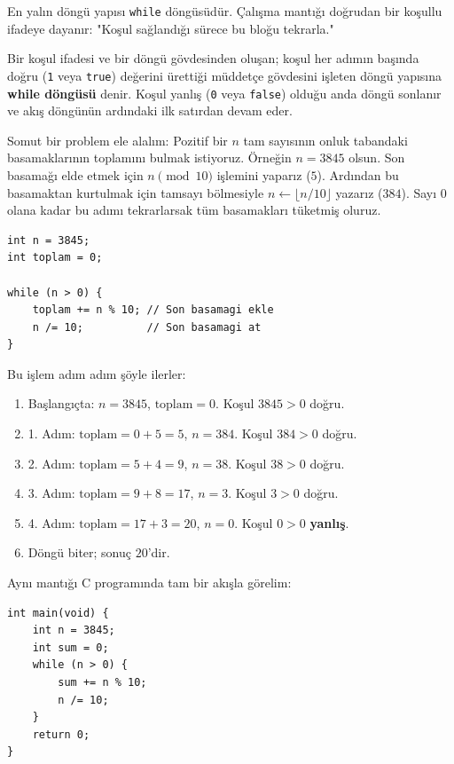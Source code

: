 En yalın döngü yapısı \texttt{while} döngüsüdür. Çalışma mantığı doğrudan bir koşullu ifadeye dayanır: "Koşul sağlandığı sürece bu bloğu tekrarla."

\begin{definition}
Bir koşul ifadesi ve bir döngü gövdesinden oluşan; koşul her adımın başında doğru (\texttt{1} veya \texttt{true}) değerini ürettiği müddetçe gövdesini işleten döngü yapısına \textbf{while döngüsü} denir. Koşul yanlış (\texttt{0} veya \texttt{false}) olduğu anda döngü sonlanır ve akış döngünün ardındaki ilk satırdan devam eder.
\end{definition}

Somut bir problem ele alalım: Pozitif bir $n$ tam sayısının onluk tabandaki basamaklarının toplamını bulmak istiyoruz. Örneğin $n = 3845$ olsun. Son basamağı elde etmek için $n \pmod{10}$ işlemini yaparız ($5$). Ardından bu basamaktan kurtulmak için tamsayı bölmesiyle $n \leftarrow \lfloor n / 10 \rfloor$ yazarız ($384$). Sayı $0$ olana kadar bu adımı tekrarlarsak tüm basamakları tüketmiş oluruz.

\begin{lstlisting}[language=CTemel]
int n = 3845;
int toplam = 0;

while (n > 0) {
    toplam += n % 10; // Son basamagi ekle
    n /= 10;          // Son basamagi at
}
\end{lstlisting}

Bu işlem adım adım şöyle ilerler:
\begin{enumerate}
    \item Başlangıçta: $n = 3845$, $\text{toplam} = 0$. Koşul $3845 > 0$ doğru.
    \item 1. Adım: $\text{toplam} = 0 + 5 = 5$, $n = 384$. Koşul $384 > 0$ doğru.
    \item 2. Adım: $\text{toplam} = 5 + 4 = 9$, $n = 38$. Koşul $38 > 0$ doğru.
    \item 3. Adım: $\text{toplam} = 9 + 8 = 17$, $n = 3$. Koşul $3 > 0$ doğru.
    \item 4. Adım: $\text{toplam} = 17 + 3 = 20$, $n = 0$. Koşul $0 > 0$ \textbf{yanlış}.
    \item Döngü biter; sonuç $20$'dir.
\end{enumerate}

Aynı mantığı C programında tam bir akışla görelim:

\begin{lstlisting}[language=CTemel]
int main(void) {
    int n = 3845;
    int sum = 0;
    while (n > 0) {
        sum += n % 10;
        n /= 10;
    }
    return 0;
}\end{lstlisting}

